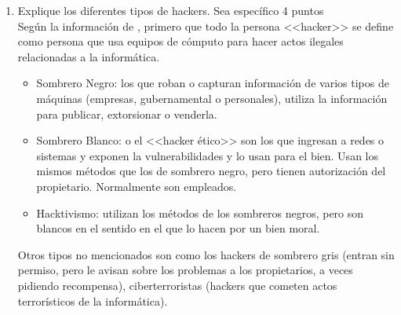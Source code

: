 \documentclass[stu, 12pt, letterpaper, donotrepeattitle, floatsintext, natbib, helv]{apa7}
\begin{document}
\begin{enumerate}
    \item Explique los diferentes tipos de hackers. Sea específico 4 puntos \\
    Según la información de , primero que todo la persona <<hacker>> se define como persona que usa equipos de cómputo para hacer actos ilegales relacionadas a la informática.
    \begin{itemize}
        \item Sombrero Negro: los que roban o capturan información de varios tipos de máquinas (empresas, gubernamental o personales), utiliza la información para publicar, extorsionar o venderla.
        \item Sombrero Blanco: o el <<hacker ético>> son los que ingresan a redes o sistemas y exponen la vulnerabilidades y lo usan para el bien. Usan los mismos métodos que los de sombrero negro, pero tienen autorización del propietario. Normalmente son empleados.
        \item Hacktivismo: utilizan los métodos de los sombreros negros, pero son blancos en el sentido en el que lo hacen por un bien moral.
    \end{itemize}
    Otros tipos no mencionados son como los hackers de sombrero gris (entran sin permiso, pero le avisan sobre los problemas a los propietarios, a veces pidiendo recompensa), ciberterroristas (hackers que cometen actos terrorísticos de la informática).

\end{enumerate}

\nocite{UPS1}\nocite{UPS2}\nocite{Manjaro}\nocite{Ubuntu}\nocite{VirtualBox}

\newpage
\renewcommand\refname{\large\textbf{Referencias}}

\end{document}
